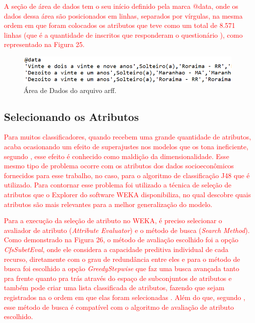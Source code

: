 \par
\textcolor{red}{A seção de área de dados tem o seu início definido pela marca @data, onde os dados dessa área são posicionados em linhas, separados por vírgulas, na mesma ordem em que foram colocados os atributos que teve como um total de 8.571 linhas (que é a quantidade de inscritos que responderam o questionário ), como representado na Figura 25.}

\par
\begin{figure}[!htp]
	\begin{center}
    \caption{\label{fig:waveform_fig} Área de Dados do arquivo arff.}
	\includegraphics[scale=0.60]{Figuras/arquivo_arff_2.png}
	\end{center}
\end{figure}


\subsection{Selecionando os Atributos}

\par
\textcolor{red}{Para muitos classificadores, quando recebem uma grande quantidade de atributos, acaba ocasionando um efeito de superajustes nos modelos que os tona ineficiente, segundo , esse efeito é conhecido como maldição da dimensionalidade. Esse mesmo tipo de problema ocorre com os atributos dos dados socioeconômicos fornecidos para esse trabalho, no caso, para o algoritmo de classificação J48 que é utilizado. Para contornar esse problema foi utilizado a técnica de seleção de atributos que o Explorer do software WEKA disponibiliza, no qual descobre quais atributos são mais relevantes para a melhor generalização do modelo.}

\par
\textcolor{red}{Para a execução da seleção de atributo no WEKA, é preciso selecionar o avaliador de atributo (\textit{Attribute Evaluator}) e o método de busca (\textit{Search Method}). Como demonstrado na Figura 26, o método de avaliação escolhido foi a opção \textit{CfsSubetEval}, onde ele considera a capacidade preditiva individual de cada recurso, diretamente com o grau de redundância entre eles e para o método de busca foi escolhido a opção \textit{GreedyStepwise} que faz uma busca avançada tanto pra frente quanto pra trás através do espaço de subconjuntos de atributos e também pode criar uma lista classificada de atributos, fazendo que sejam registrados na o ordem em que elas foram selecionadas \cite{WEKA}. Além do que, segundo , esse método de busca é compatível com o algoritmo de avaliação de atributo escolhido. }

